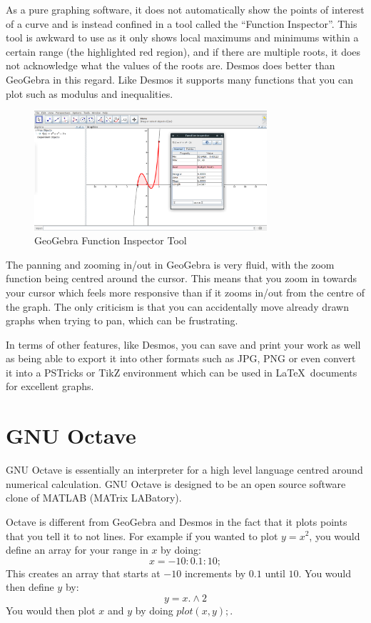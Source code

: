 \documentclass[../../../main.tex]{subfiles}
\begin{document}
As a pure graphing software, it does not automatically show the points of interest of a curve and is instead confined in a tool called the ``Function Inspector''. This tool is awkward to use as it only shows local maximums and minimums within a certain range (the highlighted red region), and if there are multiple roots, it does not acknowledge what the values of the roots are. Desmos does better than GeoGebra in this regard. Like Desmos it supports many functions that you can plot such as modulus and inequalities.
\begin{figure}[H]
	\begin{center}
		\includegraphics[width=0.77\textwidth]{images/geogebraFunc}
	\end{center}
	\caption{GeoGebra Function Inspector Tool}
\end{figure}
The panning and zooming in/out in GeoGebra is very fluid, with the zoom function being centred around the cursor. This means that you zoom in towards your cursor which feels more  responsive than if it zooms in/out from the centre of the graph. The only criticism is that you can accidentally move already drawn graphs when trying to pan, which can be frustrating.

In terms of other features, like Desmos, you can save and print your work as well as being able to export it into other formats such as JPG, PNG or even convert it into a PSTricks or TikZ environment which can be used in \LaTeX \ documents for excellent graphs.

\section{GNU Octave}
GNU Octave is essentially an interpreter for a high level language centred around numerical calculation. GNU Octave is designed to be an open source software clone of MATLAB (MATrix LABatory).
\newline

Octave is different from GeoGebra and Desmos in the fact that it plots points that you tell it to not lines. For example if you wanted to plot $y=x^2$, you would define an array for your range in $x$ by doing:
\[x = -10:0.1:10;\]
This creates an array that starts at $-10$ increments by $0.1$ until $10$. You would then define $y$ by:
\[y = x.\wedge 2\]
You would then plot $x$ and $y$ by doing $plot(x,y);$.
\end{document}
